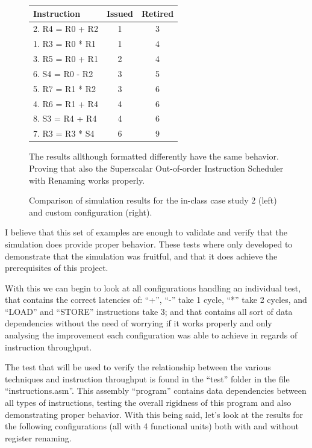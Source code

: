 \documentclass{article}
\begin{document}
\begin{enumerate}
\begin{figure}[H]
\begin{minipage}[t]{0.45\textwidth}
            \setlength{\tabcolsep}{3pt} %
            \begin{tabular}{|p{3.4cm}|c|c|}
                \hline
                \textbf{Instruction} & \textbf{Issued} & \textbf{Retired} \\ \hline
                2. R4 = R0 + R2 & 1 & 3 \\ \hline 
                1. R3 = R0 * R1 & 1 & 4 \\ \hline 
                3. R5 = R0 + R1 & 2 & 4 \\ \hline 
                6. S4 = R0 - R2 & 3 & 5 \\ \hline 
                5. R7 = R1 * R2 & 3 & 6 \\ \hline 
                4. R6 = R1 + R4 & 4 & 6 \\ \hline 
                8. S3 = R4 + R4 & 4 & 6 \\ \hline 
                7. R3 = R3 * S4 & 6 & 9 \\ \hline 
            \end{tabular}
            \vspace{1em} %
            \raggedright

            The results allthough formatted differently have the same behavior. Proving that also the Superscalar Out-of-order Instruction Scheduler with Renaming works properly. 
        \end{minipage}
        \caption{Comparison of simulation results for the in-class case study 2 (left) and custom configuration (right).}
    \end{figure}
\end{enumerate}

I believe that this set of examples are enough to validate and verify that the simulation does provide proper behavior. These tests where only developed to demonstrate that the simulation was fruitful, and that it does achieve the prerequisites of this project. 

With this we can begin to look at all configurations handling an individual test, that contains the correct latencies of: ``+'', ``-'' take 1 cycle, ``*'' take 2 cycles, and ``LOAD'' and ``STORE'' instructions take 3; and that contains all sort of data dependencies without the need of worrying if it works properly and only analysing the improvement each configuration was able to achieve in regards of instruction throughput.

The test that will be used to verify the relationship between the various techniques and instruction throughput is found in the ``test'' folder in the file ``instructions.asm''. This assembly ``program'' contains data dependencies between all types of instructions, testing the overall rigidness of this program and also demonstrating proper behavior. With this being said, let's look at the results for the following configurations (all with 4 functional units) both with and without register renaming.
\end{document}
